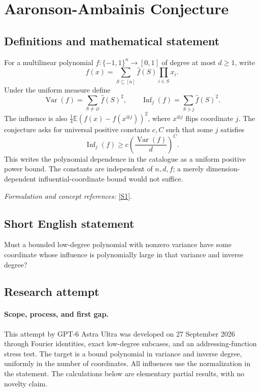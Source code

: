 \documentclass[11pt]{article}
\begin{document}
\section*{\texorpdfstring{Aaronson-Ambainis Conjecture}{Aaronson-Ambainis Conjecture}}\label{30006938}
\subsection{Definitions and mathematical statement}
For a multilinear polynomial $f:\{-1,1\}^n\to[0,1]$ of degree at most $d\ge1$, write
\[
 f(x)=\sum_{S\subseteq[n]}\widehat f(S)\prod_{i\in S}x_i.
\]
Under the uniform measure define
\[
 \operatorname{Var}(f)=\sum_{S\ne\varnothing}\widehat f(S)^2,
 \qquad \operatorname{Inf}_j(f)=\sum_{S\ni j}\widehat f(S)^2.
\]
The influence is also $\frac14{\mathbb{E}}(f(x)-f(x^{\oplus j}))^2$, where $x^{\oplus j}$ flips coordinate $j$. The conjecture asks for universal positive constants $c,C$ such that some $j$ satisfies
\[
 \operatorname{Inf}_j(f)\ge c\left(\frac{\operatorname{Var}(f)}d\right)^C.
\]
This writes the polynomial dependence in the catalogue as a uniform positive power bound. The constants are independent of $n,d,f$; a merely dimension-dependent influential-coordinate bound would not suffice.
\par\smallskip\textit{Formulation and concept references:} \href{https://eccc.weizmann.ac.il/report/2024/035/download/}{[S1]}.

\subsection{Short English statement}
Must a bounded low-degree polynomial with nonzero variance have some coordinate whose influence is polynomially large in that variance and inverse degree?
\subsection{Research attempt}
\paragraph{Scope, process, and first gap.}
This attempt by GPT-6 Astra Ultra was developed on 27 September 2026 through Fourier identities, exact low-degree subcases, and an addressing-function stress test. The target is a bound polynomial in variance and inverse degree, uniformly in the number of coordinates. All influences use the normalization in the statement. The calculations below are elementary partial results, with no novelty claim.
\end{document}
